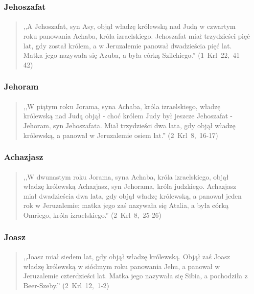 \documentclass[10pt,a4paper,oneside]{article}
\begin{document}
\subsubsection{Jehoszafat}
\paragraph{}
\begin{quote}
,,A Jehoszafat, syn Asy, objął władzę królewską nad Judą w czwartym roku panowania Achaba, króla izraelskiego. Jehoszafat miał trzydzieści pięć lat, gdy został królem, a w Jeruzalemie panował dwadzieścia pięć lat. Matka jego nazywała się Azuba, a była córką Szilchiego.'' \mbox{(1 Krl 22, 41-42)}
\end{quote}
\subsubsection{Jehoram}
\paragraph{}
\begin{quote}
,,W piątym roku Jorama, syna Achaba, króla izraelskiego, władzę królewską nad Judą objął - choć królem Judy był jeszcze Jehoszafat - Jehoram, syn Jehoszafata. Miał trzydzieści dwa lata, gdy objął władzę królewską, a panował w Jeruzalemie osiem lat.'' \mbox{(2 Krl 8, 16-17)}
\end{quote}
\subsubsection{Achazjasz}
\paragraph{}
\begin{quote}
,,W dwunastym roku Jorama, syna Achaba, króla izraelskiego, objął władzę królewską Achazjasz, syn Jehorama, króla judzkiego. Achazjasz miał dwadzieścia dwa lata, gdy objął władzę królewską, a panował jeden rok w Jeruzalemie; matka jego zaś nazywała się Atalia, a była córką Omriego, króla izraelskiego.'' \mbox{(2 Krl 8, 25-26)}
\end{quote}
\subsubsection{Joasz}
\paragraph{}
\begin{quote}
,,Joasz miał siedem lat, gdy objął władzę królewską. Objął zaś Joasz władzę królewską w siódmym roku panowania Jehu, a panował w Jeruzalemie czterdzieści lat. Matka jego nazywała się Sibia, a pochodziła z Beer-Szeby.'' \mbox{(2 Krl 12, 1-2)}
\end{quote}
\end{document}

